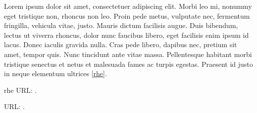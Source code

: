 \documentclass[a4paper,10pt,openany,oneside,english]{sphinxmanual}
\begin{document}
\sphinxAtStartPar
Lorem ipsum dolor sit amet, consectetuer adipiscing elit. Morbi leo mi, nonummy eget tristique non, rhoncus non leo.
Proin pede metus, vulputate nec, fermentum fringilla, vehicula vitae, justo. Mauris dictum facilisis augue. Duis bibendum,
lectus ut viverra rhoncus, dolor nunc faucibus libero, eget facilisis enim ipsum id lacus. Donec iaculis gravida nulla.
Cras pede libero, dapibus nec, pretium sit amet, tempor quis. Nunc tincidunt ante vitae massa. Pellentesque habitant
morbi tristique senectus et netus et malesuada fames ac turpis egestas.
Praesent id justo in neque elementum ultrices {[}\hyperlink{cite.guides/operational/cso/citations:id5}{rhe}{]}.

\sphinxAtStartPar


\begin{sphinxthebibliography}{rhe}
\sphinxAtStartPar
URL: .

\sphinxAtStartPar
URL: .
\end{sphinxthebibliography}



\renewcommand{\indexname}{Index}
\printindex
\end{document}
